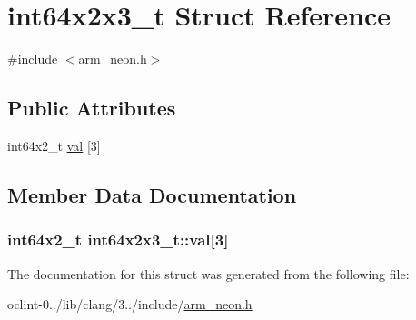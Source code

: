 \hypertarget{structint64x2x3__t}{\section{int64x2x3\-\_\-t Struct Reference}
\label{structint64x2x3__t}
}


{\ttfamily \#include $<$arm\-\_\-neon.\-h$>$}

\subsection*{Public Attributes}
\begin{DoxyCompactItemize}
\item 
int64x2\-\_\-t \hyperlink{structint64x2x3__t_abc6185fdfb4ff4b548b1aa9e68d506fc}{val} \mbox{[}3\mbox{]}
\end{DoxyCompactItemize}


\subsection{Member Data Documentation}
\hypertarget{structint64x2x3__t_abc6185fdfb4ff4b548b1aa9e68d506fc}{
\subsubsection[{val}]{\setlength{\rightskip}{0pt plus 5cm}int64x2\-\_\-t int64x2x3\-\_\-t\-::val\mbox{[}3\mbox{]}}}\label{structint64x2x3__t_abc6185fdfb4ff4b548b1aa9e68d506fc}


The documentation for this struct was generated from the following file\-:\begin{DoxyCompactItemize}
\item 
oclint-\/0../lib/clang/3../include/\hyperlink{arm__neon_8h}{arm\-\_\-neon.\-h}\end{DoxyCompactItemize}
